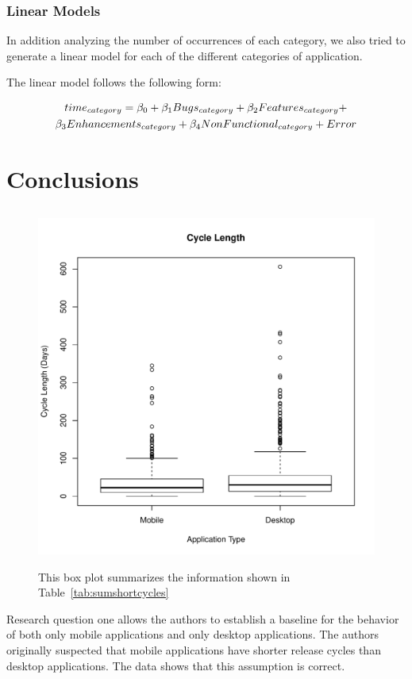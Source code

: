 \documentclass{acm_proc_article-sp}
\begin{document}
\subsubsection{Linear Models }

In addition analyzing the number of occurrences of each category, we also tried to generate a linear model for each of the different categories of application.

The linear model follows the following form:

\begin{multline}
$$time_{category} = \beta_{0} + \beta_{1}Bugs_{category} + \beta_{2}Features_{category} + \\ \beta_{3} Enhancements_{category} + \beta_{4} NonFunctional_{category} + Error $$
\end{multline}

\section{Conclusions}


\subsection{\RQOne }



\begin{figure}
\includegraphics[width=.5\textwidth]{ShortCycleBoxPlot.pdf}
\label{fig:ShortCycleBox}
\caption{This box plot summarizes the information shown in Table~\ref{tab:sumshortcycles}}
\end{figure}


\label{tab:sumshortcycles}



\label{tab:shortcycles}


Research question one allows the authors to establish a baseline for the behavior of both only mobile applications and only desktop applications.
The authors originally suspected that mobile applications have shorter release cycles than desktop applications.
The data shows that this assumption is correct. 
\end{document}
